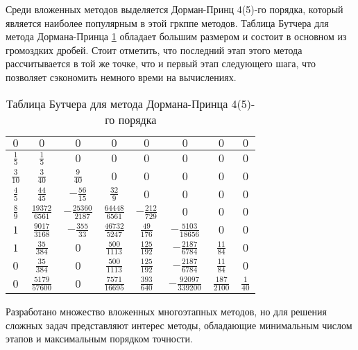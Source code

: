 Среди вложенных методов выделяется Дорман-Принц 4(5)-го порядка, который является наиболее популярным в этой гркппе методов.
Таблица Бутчера
для метода Дормана-Принца \ref{tab:DormanPrince45} обладает большим размером и состоит в основном из громоздких дробей. Стоит отметить,
что последний этап этого метода
рассчитывается в той же точке, что и первый этап следующего шага, что позволяет сэкономить немного времи на вычислениях.

\begin{table}    
    \caption{Таблица Бутчера для метода Дормана-Принца 4(5)-го порядка}
    \begin{tabular}{|c|c|c|c|c|c|c|c|}
    \hline
    $0$ & $0$ & $0$ & $0$ & $0$ & $0$ & $0$ & $0$\\
    \hline
    $\frac{1}{5}$ & $\frac{1}{5}$ & $0$ & $0$ & $0$ & $0$ & $0$ & $0$\\
    \hline
    $\frac{3}{10}$ & $\frac{3}{40}$ & $\frac{9}{40}$ & $0$ & $0$ & $0$ & $0$ & $0$\\
    \hline
    $\frac{4}{5}$ & $\frac{44}{45}$ & $-\frac{56}{15}$ & $\frac{32}{9}$ & $0$ & $0$ & $0$ & $0$\\
    \hline
    $\frac{8}{9}$ & $\frac{19372}{6561}$ & $-\frac{25360}{2187}$ & $\frac{64448}{6561}$ & $-\frac{212}{729}$ & $0$ & $0$ & $0$\\
    \hline
    $1$ & $\frac{9017}{3168}$ & $-\frac{355}{33}$ & $\frac{46732}{5247}$ & $\frac{49}{176}$ & $-\frac{5103}{18656}$ & $0$ & $0$\\
    \hline
    $1$ & $\frac{35}{384}$ & $0$ & $\frac{500}{1113}$ & $\frac{125}{192}$ & $-\frac{2187}{6784}$ & $\frac{11}{84}$ & $0$\\
    \hline
    $0$ & \cellcolor{lightgray} $\frac{35}{384}$ & \cellcolor{lightgray} $0$ & \cellcolor{lightgray} $\frac{500}{1113}$ & \cellcolor{lightgray} $\frac{125}{192}$ & \cellcolor{lightgray} $-\frac{2187}{6784}$ & \cellcolor{lightgray} $\frac{11}{84}$ & \cellcolor{lightgray} $0$\\
    \hline
    $0$ & \cellcolor{lightgray} $\frac{5179}{57600}$ & \cellcolor{lightgray} $0$ & \cellcolor{lightgray} $\frac{7571}{16695}$ & \cellcolor{lightgray} $\frac{393}{640}$ & \cellcolor{lightgray} $-\frac{92097}{339200}$ & \cellcolor{lightgray} $\frac{187}{2100}$ & \cellcolor{lightgray} $\frac{1}{40}$\\
    \hline
    \end{tabular}
    \label{tab:DormanPrince45}
\end{table}

Разработано множество вложенных многоэтапных методов, но для решения сложных задач представляют интерес методы, обладающие минимальным
числом этапов и максимальным порядком точности.

